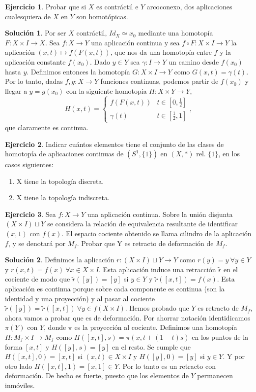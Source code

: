 \documentclass{article}
\theoremstyle{plain}
\theoremstyle{definition}
\newtheorem{exercise}{Ejercicio}
\newtheorem*{sol*}{Solución}
\begin{document}
\newpage
\begin{exercise}
Probar que si $X$ es contráctil e $Y$ arcoconexo, dos aplicaciones cualesquiera de $X$ en $Y$ son homotópicas.
\end{exercise}
\begin{sol*}
Por ser $X$ contráctil, $Id_X\simeq x_0$ mediante una homotopía $F:X\times I\to X$. Sea $f:X\to Y$ una aplicación continua y sea $f\circ F: X\times I\to Y$ la aplicación $(x,t)\mapsto f(F(x,t))$, que nos da una homotopía entre $f$ y la aplicación constante $f(x_0)$. Dado $y\in Y$ sea $\gamma: I\to Y$ un camino desde $f(x_0)$ hasta $y$. Definimos entonces la homotopía $G:X\times I\to Y$ como $G(x,t)=\gamma(t)$. Por lo tanto, dadas $f,g:X\to Y$ funciones continuas, podemos partir de $f(x_0)$ y llegar a $y=g(x_0)$ con la siguiente homotopía $H:X\times Y\to Y$,
$$
H(x,t)=\begin{cases}
f(F(x,t)) & t\in[0,\frac{1}{2}]\\
\gamma(t) & t\in[\frac{1}{2},1]
\end{cases},
$$
que claramente es continua.
\end{sol*}
\newpage
\begin{exercise}
Indicar cuántos elementos tiene el conjunto de las clases de homotopía de aplicaciones continuas de $(S^1,\{1\})$ en $(X,*)$ rel. $\{1\}$, en los casos siguientes:
\begin{enumerate}
\item X tiene la topología discreta.
\item X tiene la topología indiscreta.
\end{enumerate}
\end{exercise}
\newpage
\begin{exercise}
Sea $f:X\to Y$ una aplicación continua. Sobre la unión disjunta $(X\times I)\sqcup Y$ se considera la relación de equivalencia resultante de identificar $(x,1)$ con $f(x)$. El espacio cociente obtenido se llama cilindro de la aplicación $f$, y se denotará por $M_f$. Probar que Y es retracto de deformación de $M_f$.
\end{exercise}
\begin{sol*}
Definimos la aplicación $r:(X\times I)\sqcup Y\to Y$ como $r(y)=y\ \forall y\in Y$ y $r(x,t)=f(x)\ \forall x\in X\times I$. Esta aplicación induce una retracción $\tilde{r}$ en el cociente de modo que $\tilde{r}([y])=[y]$ si $y\in Y$ y $\tilde{r}([x,t])=f(x)$. Esta aplicación es continua porque sobre cada componente es continua (son la identidad y una proyección) y al pasar al cociente $\tilde{r}([y])=\tilde{r}([x,t])\ \forall y\in f(X\times I)$. Hemos probado que $Y$ es retracto de $M_f$, ahora vamos a probar que es de deformación. Por ahorrar notación identidicamos $\pi(Y)$ con $Y$, donde $\pi$ es la proyección al cociente. Definimos una homotopía $H:M_f\times I \to M_f$ como $H([x,t],s)=\pi(x,t+(1-t)s)$ en los puntos de la forma $[x,t]$ y $H([y],s)=[y]$ en el resto. Se cumple que $H([x,t],0)=[x,t]$ si $(x,t)\in X\times I$ y $H([y],0)=[y]$ si $y\in Y$. Y por otro lado $H([x,t],1)=[x,1]\in Y$. Por lo tanto es un retracto con deformación. De hecho es fuerte, puesto que los elementos de $Y$ permanecen inmóviles.

\end{sol*}
\end{document}
